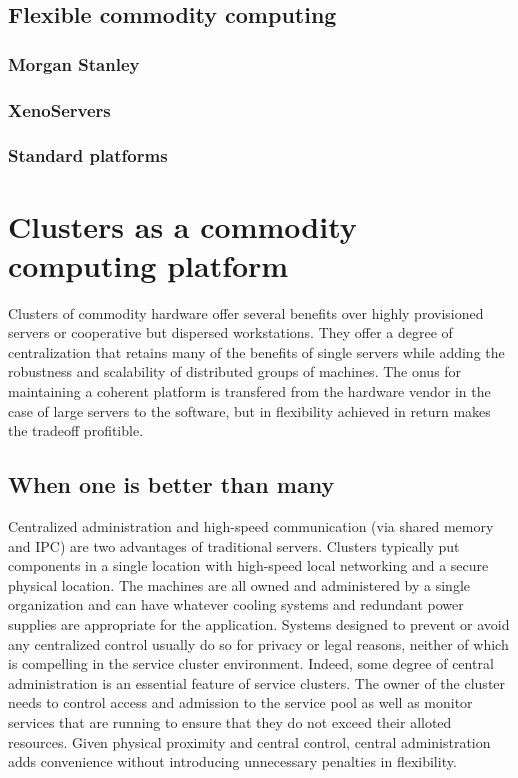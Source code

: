 \subsection{Flexible commodity computing}
\subsubsection{Morgan Stanley}
\subsubsection{XenoServers}
\subsubsection{Standard platforms}

\section{Clusters as a commodity computing platform}

Clusters of commodity hardware offer several benefits over highly provisioned servers or cooperative but dispersed workstations. They offer a degree of centralization that retains many of the benefits of single servers while adding the robustness and scalability of distributed groups of machines. The onus for maintaining a coherent platform is transfered from the hardware vendor in the case of large servers to the software, but in flexibility achieved in return makes the tradeoff profitible.

\subsection{When one is better than many}

Centralized administration and high-speed communication (via shared memory and IPC) are two advantages of traditional servers. Clusters typically put components in a single location with high-speed local networking and a secure physical location. The machines are all owned and administered by a single organization and can have whatever cooling systems and redundant power supplies are appropriate for the application. Systems designed to prevent or avoid any centralized control usually do so for privacy or legal reasons, neither of which is compelling in the service cluster environment. Indeed, some degree of central administration is an essential feature of service clusters. The owner of the cluster needs to control access and admission to the service pool as well as monitor services that are running to ensure that they do not exceed their alloted resources. Given physical proximity and central control, central administration adds convenience without introducing unnecessary penalties in flexibility.

